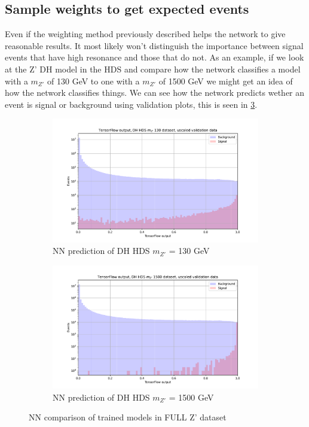 \documentclass[14pt, a4paper]{book}
\begin{document}
\subsection{Sample weights to get expected events}\label{sec:samp_wgts_NN_res}
Even if the weighting method previously described helps the network to give reasonable results. It most likely won't distinguish the importance between signal events that have high resonance and those that do not. 
As an example, if we look at the Z' DH model in the HDS and compare how the network classifies a model with a $m_{Z'}$ of 130 GeV to one with a $m_{Z'}$ of 1500 GeV we might get an idea of how the network classifies things.
We can see how the network predicts wether an event is signal or background using validation plots, this is seen in \ref{fig:PurelyBalanced_DH_HDS}.
\graphicspath{{../../../Plots/TESTING/NeuralNetwork/BALANCED_WEIGHTING/ONLY_BALANCE_MC_EVENTS_BKG_DOWN/}}
\begin{figure}[!ht]
	\centering
	\begin{subfigure}[b]{0.49\textwidth}
        \centering
        \includegraphics[width=1\textwidth]{DH_HDS_mZp_130/VAL_unscaled.pdf}
        \caption{NN prediction of DH HDS $m_{Z'}$ = 130 GeV}\label{fig:PurelyBalanced_DH_HDS_130}
     \end{subfigure}
     \hfill
     \begin{subfigure}[b]{0.49\textwidth}
        \centering
        \includegraphics[width=1\textwidth]{DH_HDS_mZp_1500/VAL_unscaled.pdf}
        \caption{NN prediction of DH HDS $m_{Z'}$ = 1500 GeV}\label{fig:PurelyBalanced_DH_HDS_1500}
     \end{subfigure}
     \caption{NN comparison of trained models in FULL Z' dataset}\label{fig:PurelyBalanced_DH_HDS}
\end{figure}
\end{document}
